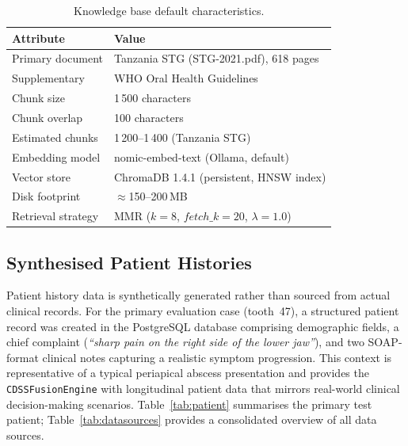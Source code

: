 \documentclass[12pt,a4paper]{report}
\begin{document}
	\begin{table}[H]
		\centering
		\caption{Knowledge base default characteristics.}
		\label{tab:kb}
		\small
		\begin{tabular}{@{}ll@{}}
			\toprule
			\textbf{Attribute} & \textbf{Value} \\
			\midrule
			Primary document  & Tanzania STG (STG-2021.pdf), 618 pages \\
			Supplementary     & WHO Oral Health Guidelines \\
			Chunk size        & 1\,500 characters \\
			Chunk overlap     & 100 characters \\
			Estimated chunks  & 1\,200--1\,400 (Tanzania STG) \\
			Embedding model   & nomic-embed-text (Ollama, default) \\
			Vector store      & ChromaDB 1.4.1 (persistent, HNSW index) \\
			Disk footprint    & $\approx$150--200\,MB \\
			Retrieval strategy& MMR ($k{=}8$, $\mathit{fetch\_k}{=}20$, $\lambda{=}1.0$) \\
			\bottomrule
		\end{tabular}
	\end{table}
	
	\subsection{Synthesised Patient Histories}
	\label{subsec:patients}
	
	Patient history data is synthetically generated rather than sourced from
	actual clinical records.  For the primary evaluation case (tooth~47),
	a structured patient record was created in the PostgreSQL database
	comprising demographic fields, a chief complaint (\textit{``sharp pain
		on the right side of the lower jaw''}), and two SOAP-format clinical
	notes capturing a realistic symptom progression.  This context is
	representative of a typical periapical abscess presentation and provides
	the \texttt{CDSSFusionEngine} with longitudinal patient data that mirrors
	real-world clinical decision-making scenarios.  Table~\ref{tab:patient}
	summarises the primary test patient; Table~\ref{tab:datasources}
	provides a consolidated overview of all data sources.
	
\end{document}
